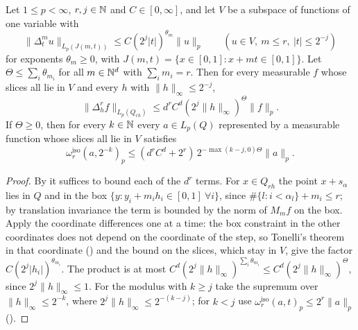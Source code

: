 \begin{theorem}
\label{thm:iso-diff-bound}
\leanok
{}
Let $1 \leq p < \infty$, $r, j \in \mathbb{N}$ and $C \in [0, \infty]$, and let $V$ be a subspace of
functions of one variable with
\[
  \|\Delta_t^m u\|_{L_p(J(m,t))} \leq C (2^j |t|)^{\theta_m} \|u\|_p
  \qquad (u \in V, \ m \leq r, \ |t| \leq 2^{-j})
\]
for exponents $\theta_m \geq 0$, with $J(m, t) = \{x \in [0, 1] : x + mt \in [0, 1]\}$. Let
$\Theta \leq \sum_i \theta_{m_i}$ for all $m \in \mathbb{N}^d$ with $\sum_i m_i = r$. Then for every
measurable $f$ whose slices all lie in $V$ and every $h$ with $\|h\|_\infty \leq 2^{-j}$,
\[
  \|\Delta_h^r f\|_{L_p(Q_{rh})} \leq d^r C^d (2^j \|h\|_\infty)^{\Theta} \|f\|_p .
\]
If $\Theta \geq 0$, then for every $k \in \mathbb{N}$ every $a \in L_p(Q)$ represented by a measurable
function whose slices all lie in $V$ satisfies
\[
  \omega^{\mathrm{iso}}_r(a, 2^{-k})_p \leq (d^r C^d + 2^r) \, 2^{-\max(k - j, 0)\Theta} \|a\|_p .
\]
\end{theorem}

\begin{proof}
\leanok
By  it suffices to bound each of the $d^r$ terms. For $x \in Q_{rh}$
the point $x + s_\alpha$ lies in $Q$ and in the box $\{y : y_i + m_i h_i \in [0, 1] \ \forall i\}$,
since $\#\{l : i < \alpha_l\} + m_i \leq r$; by translation invariance the term is bounded by the
norm of $M_m f$ on the box. Apply the coordinate differences one at a time: the box constraint in
the other coordinates does not depend on the coordinate of the step, so Tonelli's theorem in that
coordinate () and the bound on the slices, which stay in $V$, give the factor
$C (2^j |h_i|)^{\theta_{m_i}}$. The product is at most
$C^d (2^j \|h\|_\infty)^{\sum_i \theta_{m_i}} \leq C^d (2^j \|h\|_\infty)^\Theta$, since
$2^j \|h\|_\infty \leq 1$. For the modulus with $k \geq j$ take the supremum over
$\|h\|_\infty \leq 2^{-k}$, where $2^j \|h\|_\infty \leq 2^{-(k-j)}$; for $k < j$ use
$\omega^{\mathrm{iso}}_r(a, t)_p \leq 2^r \|a\|_p$ ().
\end{proof}


